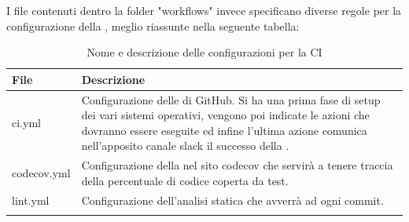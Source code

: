 I file contenuti dentro la folder "workflows" invece specificano diverse regole per la configurazione della , meglio riassunte nella seguente tabella:
{
	\setlength{\freewidth}{\dimexpr\textwidth-1\tabcolsep}
	\renewcommand{\arraystretch}{1.5}
	\setlength{\aboverulesep}{0pt}
	\setlength{\belowrulesep}{0pt}
	\begin{longtable}{L{.15\freewidth} L{.85\freewidth}}
		\textbf{File} & \textbf{Descrizione}\\
		\toprule
		\endhead	
		ci.yml & Configurazione delle  di GitHub. Si ha una prima fase di setup dei vari sistemi operativi, vengono poi indicate le azioni che dovranno essere eseguite ed infine l'ultima azione comunica nell'apposito canale slack il successo della .\\
		codecov.yml & Configurazione della  nel sito codecov che servirà a tenere traccia della percentuale di codice coperta da test.\\
		lint.yml & Configurazione dell'analisi statica che avverrà ad ogni commit. \\
		\bottomrule
		\hiderowcolors
		\caption{Nome e descrizione delle configurazioni per la CI}
	\end{longtable}
}
